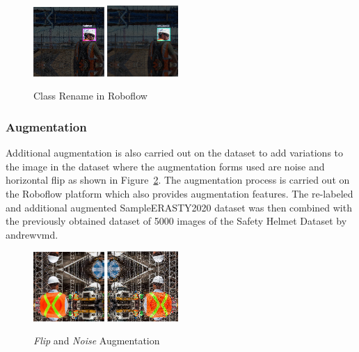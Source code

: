 \begin{figure}[ht]
  \centering
  \includegraphics[width=0.24\textwidth]{gambar/utilities/reclass_old.png}
  \includegraphics[width=0.24\textwidth]{gambar/utilities/reclass_new.png}
  \caption{Class Rename in Roboflow}
  \label{fig:prepro_classrename}  
\end{figure}

\subsubsection{Augmentation}
\label{subsec:augmentation}
\par Additional augmentation is also carried out on the dataset to add variations to the image in the dataset where the augmentation forms used are noise and horizontal flip as shown in Figure~\ref{fig:prepro_augmentasi}. The augmentation process is carried out on the Roboflow platform which also provides augmentation features. The re-labeled and additional augmented SampleERASTY2020 dataset was then combined with the previously obtained dataset of 5000 images of the Safety Helmet Dataset by andrewvmd.

\begin{figure}[ht]
  \centering
  \includegraphics[width=0.24\textwidth]{gambar/utilities/aug_flip.png}
  \includegraphics[width=0.24\textwidth]{gambar/utilities/aug_noise.png}
  \caption{\emph{Flip} and \emph{Noise} Augmentation}
  \label{fig:prepro_augmentasi}  
\end{figure}

